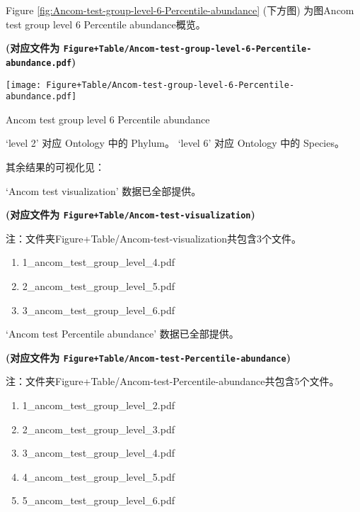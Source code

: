 \documentclass[
]{article}
\providecommand{\tightlist}{%
  \setlength{\itemsep}{0pt}\setlength{\parskip}{0pt}}
\begin{document}
Figure \ref{fig:Ancom-test-group-level-6-Percentile-abundance} (下方图) 为图Ancom test group level 6 Percentile abundance概览。

\textbf{(对应文件为 \texttt{Figure+Table/Ancom-test-group-level-6-Percentile-abundance.pdf})}

\def\@captype{figure}
\begin{center}
\texttt{[image: Figure+Table/Ancom-test-group-level-6-Percentile-abundance.pdf]}
\caption{Ancom test group level 6 Percentile abundance}\label{fig:Ancom-test-group-level-6-Percentile-abundance}
\end{center}

`level 2' 对应 Ontology 中的 Phylum。
`level 6' 对应 Ontology 中的 Species。

其余结果的可视化见：

`Ancom test visualization' 数据已全部提供。

\textbf{(对应文件为 \texttt{Figure+Table/Ancom-test-visualization})}

\begin{center}\begin{tcolorbox}[colback=gray!10, colframe=gray!50, width=0.9\linewidth, arc=1mm, boxrule=0.5pt]注：文件夹Figure+Table/Ancom-test-visualization共包含3个文件。

\begin{enumerate}\tightlist
\item 1\_ancom\_test\_group\_level\_4.pdf
\item 2\_ancom\_test\_group\_level\_5.pdf
\item 3\_ancom\_test\_group\_level\_6.pdf
\end{enumerate}\end{tcolorbox}
\end{center}

`Ancom test Percentile abundance' 数据已全部提供。

\textbf{(对应文件为 \texttt{Figure+Table/Ancom-test-Percentile-abundance})}

\begin{center}\begin{tcolorbox}[colback=gray!10, colframe=gray!50, width=0.9\linewidth, arc=1mm, boxrule=0.5pt]注：文件夹Figure+Table/Ancom-test-Percentile-abundance共包含5个文件。

\begin{enumerate}\tightlist
\item 1\_ancom\_test\_group\_level\_2.pdf
\item 2\_ancom\_test\_group\_level\_3.pdf
\item 3\_ancom\_test\_group\_level\_4.pdf
\item 4\_ancom\_test\_group\_level\_5.pdf
\item 5\_ancom\_test\_group\_level\_6.pdf
\end{enumerate}\end{tcolorbox}
\end{center}
\end{document}
